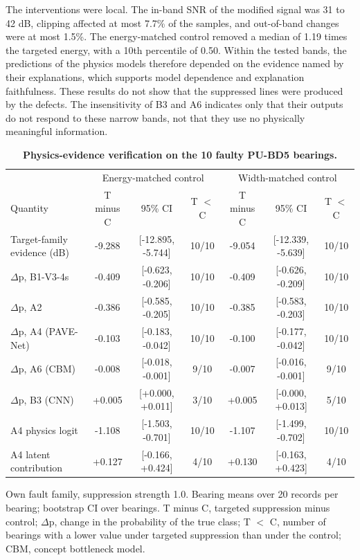 \documentclass[10pt,letterpaper]{article}
\begin{document}
The interventions were local. The in-band SNR of the modified signal was 31 to 42 dB, clipping affected at most 7.7\% of the samples, and out-of-band changes were at most 1.5\%. The energy-matched control removed a median of 1.19 times the targeted energy, with a 10th percentile of 0.50. Within the tested bands, the predictions of the physics models therefore depended on the evidence named by their explanations, which supports model dependence and explanation faithfulness. These results do not show that the suppressed lines were produced by the defects. The insensitivity of B3 and A6 indicates only that their outputs do not respond to these narrow bands, not that they use no physically meaningful information.

\begin{table}[!ht]
\centering
\caption{\textbf{Physics-evidence verification on the 10 faulty PU-BD5 bearings.}}
{\footnotesize
\setlength{\tabcolsep}{4pt}
\renewcommand{\arraystretch}{1.25}
\begin{tabular}{lcccccc}
\hline
 & \multicolumn{3}{c}{Energy-matched control} & \multicolumn{3}{c}{Width-matched control} \\
Quantity & T minus C & 95\% CI & T $<$ C & T minus C & 95\% CI & T $<$ C \\
\hline
Target-family evidence (dB) & -9.288 & [-12.895, -5.744] & 10/10 & -9.054 & [-12.339, -5.639] & 10/10 \\
$\Delta$p, B1-V3-4s & -0.409 & [-0.623, -0.206] & 10/10 & -0.409 & [-0.626, -0.209] & 10/10 \\
$\Delta$p, A2 & -0.386 & [-0.585, -0.205] & 10/10 & -0.385 & [-0.583, -0.203] & 10/10 \\
$\Delta$p, A4 (PAVE-Net) & -0.103 & [-0.183, -0.042] & 10/10 & -0.100 & [-0.177, -0.042] & 10/10 \\
$\Delta$p, A6 (CBM) & -0.008 & [-0.018, -0.001] & 9/10 & -0.007 & [-0.016, -0.001] & 9/10 \\
$\Delta$p, B3 (CNN) & +0.005 & [+0.000, +0.011] & 3/10 & +0.005 & [-0.000, +0.013] & 5/10 \\
A4 physics logit & -1.108 & [-1.503, -0.701] & 10/10 & -1.107 & [-1.499, -0.702] & 10/10 \\
A4 latent contribution & +0.127 & [-0.166, +0.424] & 4/10 & +0.130 & [-0.163, +0.423] & 4/10 \\
\hline
\end{tabular}}
\begin{flushleft} Own fault family, suppression strength 1.0. Bearing means over 20 records per bearing; bootstrap CI over bearings. T minus C, targeted suppression minus control; $\Delta$p, change in the probability of the true class; T $<$ C, number of bearings with a lower value under targeted suppression than under the control; CBM, concept bottleneck model. \end{flushleft}
\label{tab:pev}
\end{table}
\end{document}
